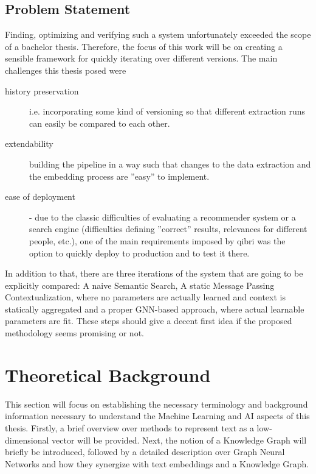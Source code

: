 \documentclass[draft,final]{vutinfth} %
\begin{document}
\section{Problem Statement}
Finding, optimizing and verifying such a system unfortunately exceeded the scope of a bachelor thesis. Therefore, the focus of this work will be on creating a sensible framework for quickly iterating over different versions. The main challenges this thesis posed were
\begin{description}

    \item[history preservation] i.e. incorporating some kind of versioning so that different extraction runs can easily be compared to each other.
    \item[extendability] building the pipeline in a way such that changes to the data extraction and the embedding process are ''easy'' to implement.
    \item[ease of deployment] - due to the classic difficulties of evaluating a recommender system or a search engine (difficulties defining ''correct'' results, relevances for different people, etc.), one of the main requirements imposed by qibri was the option to quickly deploy to production and to test it there.
\end{description}
In addition to that, there are three iterations of the system that are going to be explicitly compared: A naive Semantic Search, A static Message Passing Contextualization, where no parameters are actually learned and context is statically aggregated and a proper GNN-based approach, where actual learnable parameters are fit. These steps should give a decent first idea if the proposed methodology seems promising or not.


\chapter{Theoretical Background}
This section will focus on establishing the necessary terminology and background information necessary to understand the Machine Learning and AI aspects of this thesis. Firstly, a brief overview over methods to represent text as a low-dimensional vector will be provided. Next, the notion of a Knowledge Graph will briefly be introduced, followed by a detailed description over Graph Neural Networks and how they synergize with text embeddings and a Knowledge Graph.
\end{document}
